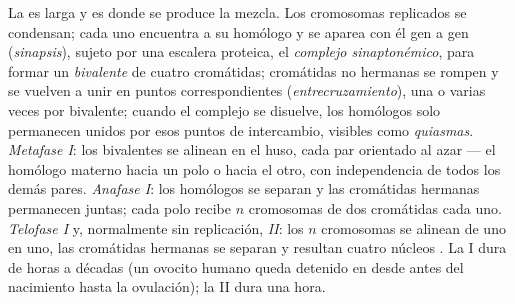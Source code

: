 \begin{proposition}\label{prop:b2:meiosis-heredity:stages}
La \emph{} es larga y es donde se produce la mezcla. Los
cromosomas replicados se condensan; cada uno encuentra a su homólogo y
se aparea con él gen a gen (\emph{sinapsis}), sujeto por una escalera
proteica, el \emph{complejo sinaptonémico}, para formar un
\emph{bivalente} de cuatro cromátidas; cromátidas no hermanas se rompen y
se vuelven a unir en puntos correspondientes (\emph{entrecruzamiento}),
una o varias veces por bivalente; cuando el complejo se disuelve, los
homólogos solo permanecen unidos por esos puntos de intercambio, visibles
como \emph{quiasmas}. \emph{Metafase I}: los bivalentes se alinean en el
huso, cada par orientado al azar --- el homólogo materno hacia un polo o
hacia el otro, con independencia de todos los demás pares.
\emph{Anafase I}: los homólogos se separan y las cromátidas hermanas
permanecen juntas; cada polo recibe $n$ cromosomas de dos cromátidas
cada uno. \emph{Telofase I} y, normalmente sin replicación,
\emph{ II}: los $n$ cromosomas se alinean de uno en uno, las
cromátidas hermanas se separan y resultan cuatro núcleos . La
 I dura de horas a décadas (un ovocito humano queda detenido en
 desde antes del nacimiento hasta la ovulación); la  II
dura una hora.
\end{proposition}

